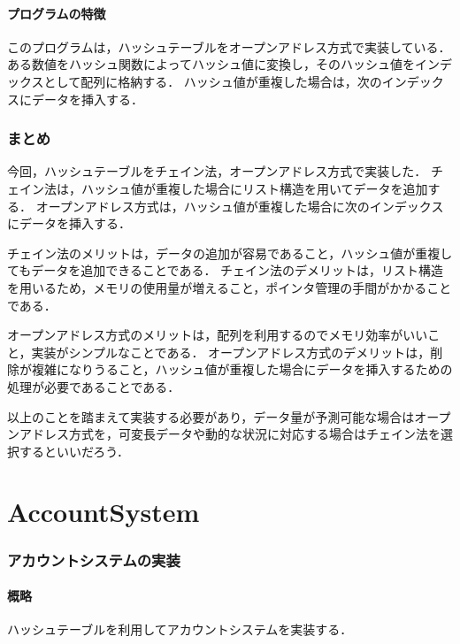\documentclass{ltjsarticle}
\begin{document}
\subsection{プログラムの特徴}
このプログラムは，ハッシュテーブルをオープンアドレス方式で実装している．
ある数値をハッシュ関数によってハッシュ値に変換し，そのハッシュ値をインデックスとして配列に格納する．
ハッシュ値が重複した場合は，次のインデックスにデータを挿入する．

\section{まとめ}
今回，ハッシュテーブルをチェイン法，オープンアドレス方式で実装した．
チェイン法は，ハッシュ値が重複した場合にリスト構造を用いてデータを追加する．
オープンアドレス方式は，ハッシュ値が重複した場合に次のインデックスにデータを挿入する．

チェイン法のメリットは，データの追加が容易であること，ハッシュ値が重複してもデータを追加できることである．
チェイン法のデメリットは，リスト構造を用いるため，メモリの使用量が増えること，ポインタ管理の手間がかかることである．

オープンアドレス方式のメリットは，配列を利用するのでメモリ効率がいいこと，実装がシンプルなことである．
オープンアドレス方式のデメリットは，削除が複雑になりうること，ハッシュ値が重複した場合にデータを挿入するための処理が必要であることである．

以上のことを踏まえて実装する必要があり，データ量が予測可能な場合はオープンアドレス方式を，可変長データや動的な状況に対応する場合はチェイン法を選択するといいだろう．

\part{AccountSystem}

\section{アカウントシステムの実装}
\subsection{概略}
ハッシュテーブルを利用してアカウントシステムを実装する．
\end{document}
